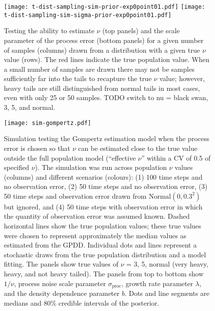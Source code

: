 \documentclass[11pt]{article}
\begin{document}
\begin{figure}[htbp]
\begin{center}
\texttt{[image: t-dist-sampling-sim-prior-exp0point01.pdf]}
\texttt{[image: t-dist-sampling-sim-sigma-prior-exp0point01.pdf]}
\caption{
  Testing the ability to estimate $\nu$ (top panels) and the scale parameter of the process error (bottom panels) for a given number of samples (columns) drawn from a distribution with a given true $\nu$ value (rows). The red lines indicate the true population value. When a small number of samples are drawn there may not be samples sufficiently far into the tails to recapture the true $\nu$ value; however, heavy tails are still distinguished from normal tails in most cases, even with only 25 or 50 samples. TODO switch to nu = black swan, 3, 5, and normal.
}
\label{fig:sim-nu}
\end{center}
\end{figure}

\clearpage

\begin{figure}[htbp]
\begin{center}
\texttt{[image: sim-gompertz.pdf]}
\caption{Simulation testing the Gompertz estimation model when the process error is chosen so that $\nu$ can be estimated close to the true value outside the full population model (``effective $\nu$'' within a CV of 0.5 of specified $\nu$).
  The simulation was run across population $\nu$ values (columns) and different scenarios (colours): (1) 100 time steps and no observation error, (2) 50 time steps and no observation error, (3) 50 time steps and observation error drawn from $\mathrm{Normal} (0, 0.3^2)$ but ignored, and (4) 50 time steps with observation error in which the quantity of observation error was assumed known.
  Dashed horizontal lines show the true population values;
  these true values were chosen to represent approximately the median values as estimated from the GPDD.
  Individual dots and lines represent a stochastic draws from the true population distribution and a model fitting.
  The panels show true values of $\nu$ =  3, 5, normal (very heavy, heavy, and not heavy tailed).
  The panels from top to bottom show $1/\nu$, process noise scale parameter $\sigma_\mathrm{proc}$, growth rate parameter $\lambda$, and the density dependence parameter $b$.
  Dots and line segments are medians and 80\% credible intervals of the posterior.}
\label{fig:sim-gompertz}
\end{center}
\end{figure}
\end{document}
